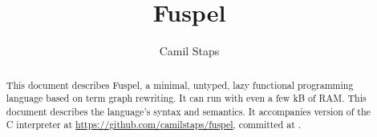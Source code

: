 \documentclass[a4paper]{article}
\author{Camil Staps}
\title{Fuspel}
\date{\gitcommitdate[formatDate]}
\begin{document}
\maketitle

\begin{abstract}
	This document describes Fuspel,
	a minimal, untyped, lazy functional programming language
	based on term graph rewriting.
	It can run with even a few kB of RAM.
	This document describes the language's syntax and semantics.
	It accompanies version \gitcommithash{} of the C interpreter at
	\url{https://github.com/camilstaps/fuspel}, committed at
	.
\end{abstract}

\tableofcontents



\appendix

\clearpage

\clearpage

\end{document}
